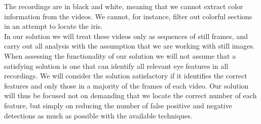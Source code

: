 	The recordings are in black and white, meaning that we cannot extract color information from the videos. We cannot, for instance, filter out colorful sections in an attempt to locate the iris.\\
	
	In our solution we will treat these videos only as sequences of still frames, and carry out all analysis with the assumption that we are working with still images.\\
	
	When assessing the functionality of our solution we will not assume that a satisfying solution is one that can identify all relevant eye features in all recordings. We will consider the solution satisfactory if it identifies the correct features and only those in a majority of the frames of each video. Our solution will thus be focused not on demanding that we locate the correct number of each feature, but simply on reducing the number of false positive and negative detections as much as possible with the available techniques. 